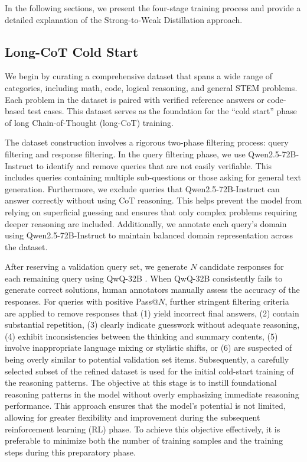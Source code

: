 \documentclass[dvipsnames]{article}
\begin{document}
In the following sections, we present the four-stage training process and provide a detailed explanation of the Strong-to-Weak Distillation approach.

\subsection{Long-CoT Cold Start}

We begin by curating a comprehensive dataset that spans a wide range of categories, including math, code, logical reasoning, and general STEM problems. Each problem in the dataset is paired with verified reference answers or code-based test cases. This dataset serves as the foundation for the ``cold start'' phase of long Chain-of-Thought (long-CoT) training.

The dataset construction involves a rigorous two-phase filtering process: query filtering and response filtering.
In the query filtering phase, we use Qwen2.5-72B-Instruct to identify and remove queries that are not easily verifiable. This includes queries containing multiple sub-questions or those asking for general text generation. 
Furthermore, we exclude queries that Qwen2.5-72B-Instruct can answer correctly without using CoT reasoning. This helps prevent the model from relying on superficial guessing and ensures that only complex problems requiring deeper reasoning are included.
Additionally, we annotate each query's domain using Qwen2.5-72B-Instruct to maintain balanced domain representation across the dataset.

After reserving a validation query set, we generate $N$ candidate responses for each remaining query using QwQ-32B \citep{qwq32b}. 
When QwQ-32B consistently fails to generate correct solutions, human annotators manually assess the accuracy of the responses.
For queries with positive Pass@$N$, further stringent filtering criteria are applied to remove responses that (1) yield incorrect final answers, (2) contain substantial repetition, (3) clearly indicate guesswork without adequate reasoning, (4) exhibit inconsistencies between the thinking and summary contents, (5) involve inappropriate language mixing or stylistic shifts, or (6) are suspected of being overly similar to potential validation set items.
Subsequently, a carefully selected subset of the refined dataset is used for the initial cold-start training of the reasoning patterns. 
The objective at this stage is to instill foundational reasoning patterns in the model without overly emphasizing immediate reasoning performance. 
This approach ensures that the model's potential is not limited, allowing for greater flexibility and improvement during the subsequent reinforcement learning (RL) phase. 
To achieve this objective effectively, it is preferable to minimize both the number of training samples and the training steps during this preparatory phase.
\end{document}

